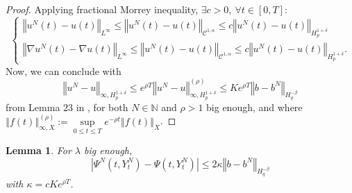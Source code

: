 \documentclass[11pt]{enstaPRE}
\newtheorem{lem}[theo]{Lemma}
\newcommand{\norme}[1]{\left\Vert #1\right\Vert}
\newcommand{\N}{\mathbb{N}}
\begin{document}
\begin{proof}
    Applying fractional Morrey inequality, $\exists c>0,\ \forall t\in[0,T]$:
    \begin{equation*}
    \begin{cases}
    \norme{u^N(t) - u(t)}_{L^\infty}\leq\norme{u^N(t) - u(t)}_{\mathcal{C}^{1,\alpha}}\leq c\norme{u^N(t)-u(t)}_{H^{1+\delta}_{p}}\\        
    \norme{\nabla u^N(t) - \nabla u(t)}_{L^\infty}\leq\norme{u^N(t) - u(t)}_{\mathcal{C}^{1,\alpha}}\leq c\norme{u^N(t)-u(t)}_{H^{1+\delta}_{p}}.
    \end{cases}        
    \end{equation*}        
    Now, we can conclude with
    \begin{equation*}
    \norme{u^N-u}_{\infty,H^{1+\delta}_{p}}\leq e^{\rho T} \norme{u^N-u}_{\infty,H^{1+\delta}_{p}}^{(\rho)}\leq Ke^{\rho T}\norme{b-b^N}_{H^{-\beta}_{q}}
    \end{equation*} from Lemma 23 in \cite{Fla-Iss-Rus-2017}, for both $N\in\N$ and $\rho>1$ big enough, and where $\norme{f(t)}_{\infty,X}^{(\rho)} := \underset{0\leq t\leq T}{\sup} e^{-\rho t} \norme{f(t)}_X$.
\end{proof}
\begin{lem}\label{psi}
    For $\lambda$ big enough, \begin{equation*}
    \left|\Psi^N\left(t,Y_t^N\right)-\Psi\left(t,Y_t^N\right)\right|\leq 2\kappa \norme{b-b^N}_{H^{-\beta}_q}
    \end{equation*} 
    with $\kappa = c Ke^{\rho T}$.
\end{lem}
\end{document}
